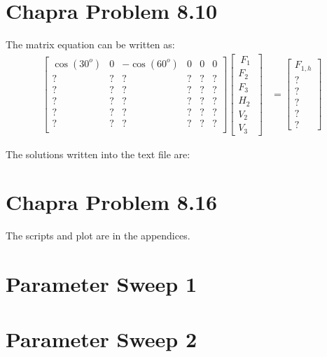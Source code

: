 \documentclass{article}
\begin{document}

\section{Chapra Problem 8.10}
The matrix equation can be written as:
\begin{align*}
\begin{bmatrix}
\cos(30^o) & 0 & -\cos(60^o) & 0 & 0 & 0\\
? & ? & ? & ? & ? & ?\\
? & ? & ? & ? & ? & ?\\
? & ? & ? & ? & ? & ?\\
? & ? & ? & ? & ? & ?\\
? & ? & ? & ? & ? & ?\\
\end{bmatrix}
\begin{bmatrix}
~F_1~ \\ F_2 \\ F_3 \\ H_2 \\ V_2 \\ V_3
\end{bmatrix}&=
\begin{bmatrix}
F_{1,h} \\ ? \\ ? \\ ? \\ ? \\ ? %
\end{bmatrix}
\end{align*}

The solutions written into the text file are:
%

\section{Chapra Problem 8.16}
The scripts and plot are in the appendices.

\section{Parameter Sweep 1}

\section{Parameter Sweep 2}
\end{document}
